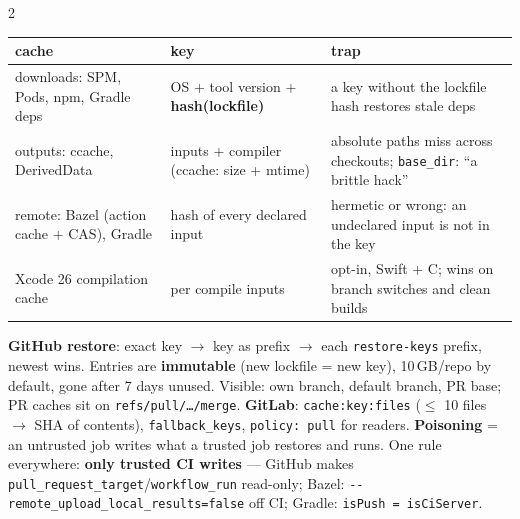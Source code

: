 \documentclass[8pt]{extarticle}
\newcommand\ct[1]{\texttt{#1}}
\newcommand\dd{\hbox{-}\hbox{-}}
\newcommand\hd[1]{\par\vspace{3pt}\noindent{\bfseries\color{sheetBlue}#1}\par\vspace{1pt}}
\begin{document}
\begin{multicols}{2}
\hd{Caching — what, key, who writes}
{\scriptsize\setlength{\tabcolsep}{2pt}
\begin{tabular}{@{}>{\raggedright\arraybackslash}p{19mm}>{\raggedright\arraybackslash}p{23mm}>{\raggedright\arraybackslash}p{35mm}@{}}
\toprule
\textbf{cache} & \textbf{key} & \textbf{trap} \\ \midrule
downloads: SPM, Pods, npm, Gradle deps & OS + tool version + \textbf{hash(lockfile)} & a key without the lockfile hash restores stale deps \\
outputs: ccache, DerivedData & inputs + compiler (ccache: size + mtime) & absolute paths miss across checkouts; \ct{base\_dir}: ``a brittle hack'' \\
remote: Bazel (action cache + CAS), Gradle & hash of every declared input & hermetic or wrong: an undeclared input is not in the key \\
Xcode 26 compilation cache & per compile inputs & opt-in, Swift + C; wins on branch switches and clean builds \\
\bottomrule
\end{tabular}}\par
\textbf{GitHub restore}: exact key $\rightarrow$ key as prefix $\rightarrow$ each \ct{restore-keys} prefix, newest wins.
Entries are \textbf{immutable} (new lockfile = new key), 10\,GB/repo by default, gone after 7 days unused. Visible: own
branch, default branch, PR base; PR caches sit on \ct{refs/pull/…/merge}. \textbf{GitLab}:
\ct{cache:key:files} ($\leq$ 10 files $\rightarrow$ SHA of contents), \ct{fallback\_keys}, \ct{policy: pull} for readers.
\textbf{Poisoning} = an untrusted job writes what a trusted job restores and runs. One rule everywhere:
\textbf{only trusted CI writes} — GitHub makes \ct{pull\_request\_target}/\ct{workflow\_run} read-only; Bazel:
\ct{\dd{}remote\_upload\_local\_results=false} off CI; Gradle: \ct{isPush = isCiServer}.


\end{multicols}
\end{document}
